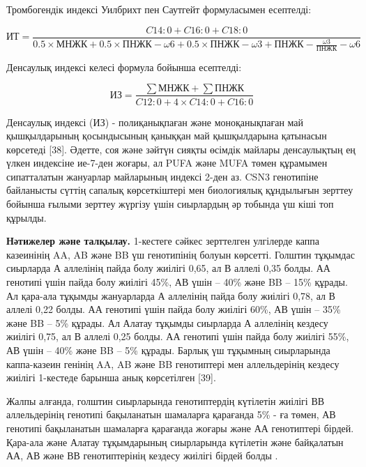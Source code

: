 Тромбогендік индексі Уилбрихт пен Саутгейт формуласымен есептелді:

\begin{equation}
  \text{ИТ} = \frac{C14:0 + C16:0 + C18:0}{0.5 \times \text{МНЖК} + 0.5 \times \text{ПНЖК}-\omega6 + 0.5 \times \text{ПНЖК}-\omega3 + \text{ПНЖК}-\frac{\omega3}{\text{ПНЖК}}-\omega6}
  \end{equation}

Денсаулық индексі келесі формула бойынша есептелді:

\begin{equation}
  \text{ИЗ} = \frac{\sum \text{МНЖК} + \sum \text{ПНЖК}}{C12:0 + 4 \times C14:0 + C16:0}
  \end{equation}


\begin{multicols}{2}
Денсаулық индексі (ИЗ) - полиқанықпаған және моноқанықпаған май
қышқылдарының қосындысының қаныққан май қышқылдарына қатынасын көрсетеді
{[}38{]}. Әдетте, соя және зәйтүн сияқты өсімдік майлары денсаулықтың ең
үлкен индексіне ие-7-ден жоғары, ал PUFA және MUFA төмен құрамымен
сипатталатын жануарлар майларының индексі 2-ден аз. CSN3 генотипіне
байланысты сүттің сапалық көрсеткіштері мен биологиялық құндылығын
зерттеу бойынша ғылыми зерттеу жүргізу үшін сиырлардың әр тобында үш
кіші топ құрылды.

{\bfseries Нәтижелер және талқылау.} 1-кестеге сәйкес зерттелген улгілерде
каппа казеинінің AA, AB және BB үш генотипінің болуын көрсетті. Голштин
тұқымдас сиырларда А аллелінің пайда болу жиілігі 0,65, ал В аллелі 0,35
болды. АА генотипі үшін пайда болу жиілігі 45\%, АВ үшін -- 40\% және BB
-- 15\% құрады. Ал қара-ала тұқымды жануарларда А аллелінің пайда болу
жиілігі 0,78, ал В аллелі 0,22 болды. АА генотипі үшін пайда болу
жиілігі 60\%, АВ үшін -- 35\% және BB -- 5\% құрады. Ал Алатау тұқымды
сиырларда А аллелінің кездесу жиілігі 0,75, ал В аллелі 0,25 болды. АА
генотипі үшін пайда болу жиілігі 55\%, АВ үшін -- 40\% және BB -- 5\%
құрады. Барлық үш тұқымның сиырларында каппа-казеин генінің AA, AB және
BB генотиптері мен аллельдерінің кездесу жиілігі 1-кестеде барынша анық
көрсетілген {[}39{]}.

Жалпы алғанда, голштин сиырларында генотиптердің күтілетін жиілігі ВВ
аллельдерінің генотипі бақыланатын шамаларға қарағанда 5\% - ға төмен,
АВ генотипі бақыланатын шамаларға қарағанда жоғары және АА генотиптері
бірдей. Қара-ала және Алатау тұқымдарының сиырларында күтілетін және
байқалатын АА, АВ және ВВ генотиптерінің кездесу жиілігі бірдей болды .


\end{multicols}
